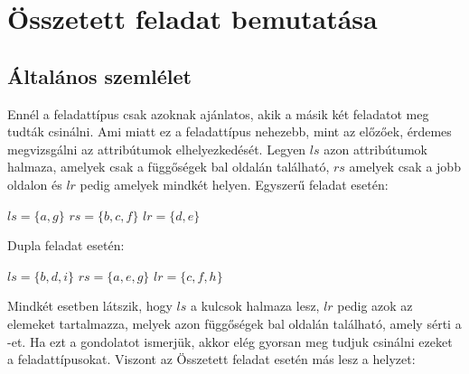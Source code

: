 \section{Összetett feladat bemutatása}

\subsection{Általános szemlélet}

Ennél a feladattípus csak azoknak ajánlatos, akik a másik két feladatot meg tudták csinálni. Ami miatt ez a feladattípus nehezebb, mint az előzőek, érdemes megvizsgálni az attribútumok elhelyezkedését. Legyen $ls$ azon attribútumok halmaza, amelyek csak a függőségek bal oldalán található, $rs$ amelyek csak a jobb oldalon és $lr$ pedig amelyek mindkét helyen.
Egyszerű feladat esetén:
\begin{center}
    $ls = \{a, g\}$ \break
    $rs = \{b, c, f\}$ \break
    $lr = \{d, e\}$
\end{center}
Dupla feladat esetén: 
\begin{center}
    $ls = \{b, d, i\}$ \break
    $rs = \{a, e, g\}$ \break
    $lr = \{c, f, h\}$
\end{center}

Mindkét esetben látszik, hogy $ls$ a kulcsok halmaza lesz, $lr$ pedig azok az elemeket tartalmazza, melyek azon függőségek bal oldalán található, amely sérti a \nfh-et. Ha ezt a gondolatot ismerjük, akkor elég gyorsan meg tudjuk csinálni ezeket a feladattípusokat.
Viszont az Összetett feladat esetén más lesz a helyzet:

